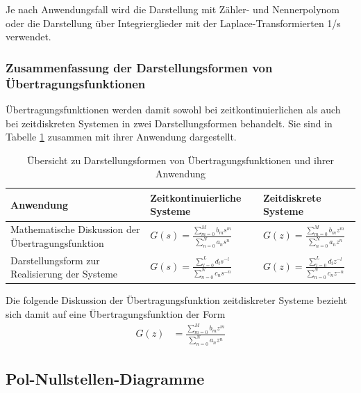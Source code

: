 Je nach Anwendungsfall wird die Darstellung mit Zähler- und Nennerpolynom oder die Darstellung über Integrierglieder mit der Laplace-Transformierten 1/s verwendet.

\subsubsection{Zusammenfassung der Darstellungsformen von Übertragungsfunktionen}\label{sec:zusammenfassung-der-darstellungsformen-von-uxfcbertragungsfunktionen}

Übertragungsfunktionen werden damit sowohl bei zeitkontinuierlichen als auch bei zeitdiskreten Systemen in zwei Darstellungsformen behandelt. Sie sind in Tabelle \ref{tab:6.3} zusammen mit ihrer Anwendung dargestellt.

\begin{table}
  \centering
  \caption{Übersicht zu Darstellungsformen von Übertragungsfunktionen und ihrer Anwendung}
  \label{tab:6.3}
  \begin{tabular}{lll}
    \toprule
    Anwendung & Zeitkontinuierliche Systeme & Zeitdiskrete Systeme \\
    \midrule
    Mathematische Diskussion der Übertragungsfunktion & \(G(s) = \frac{\sum\limits_{m = 0}^{M}{b_{m}  s^{m}}}{\sum\limits_{n = 0}^{N}{a_{n}  s^{n}}}\) & \(G(z) = \frac{\sum\limits_{m = 0}^{M}{b_{m}  z^{m}}}{\sum\limits_{n = 0}^{N}{a_{n}  z^{n}}}\) \\
    Darstellungsform zur 
Realisierung der Systeme
 & \(G(s) = \frac{\sum\limits_{l = 0}^{L}{d_{l}  s^{- l}}}{\sum\limits_{n = 0}^{N}{c_{n}  s^{- n}}}\) & \(G(z) = \frac{\sum\limits_{l = 0}^{L}{d_{l}  z^{- l}}}{\sum\limits_{n = 0}^{N}{c_{n}  z^{- n}}}\) \\
    \bottomrule
  \end{tabular}
\end{table}

Die folgende Diskussion der Übertragungsfunktion zeitdiskreter Systeme bezieht sich damit auf eine Übertragungsfunktion der Form
\begin{align}
G(z) &= \frac{\sum\limits_{m = 0}^{M}{b_{m}  z^{m}}}{\sum\limits_{n = 0}^{N}{a_{n}  z^{n}}} \label{eq:6.75}
\end{align}
\subsection{Pol-Nullstellen-Diagramme}\label{sec:pol-nullstellen-diagramme}


